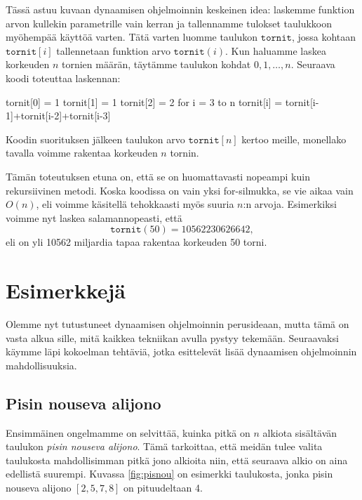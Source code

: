 Tässä astuu kuvaan dynaamisen ohjelmoinnin keskeinen idea:
laskemme funktion arvon kullekin parametrille vain kerran
ja tallennamme tulokset taulukkoon myöhempää käyttöä varten.
Tätä varten luomme taulukon $\texttt{tornit}$,
jossa kohtaan $\texttt{tornit}[i]$ tallennetaan funktion
arvo $\texttt{tornit}(i)$.
Kun haluamme laskea korkeuden $n$ tornien määrän,
täytämme taulukon kohdat $0,1,\dots,n$.
Seuraava koodi toteuttaa laskennan:

\begin{code}
tornit[0] = 1
tornit[1] = 1
tornit[2] = 2
for i = 3 to n
    tornit[i] = tornit[i-1]+tornit[i-2]+tornit[i-3]
\end{code}

Koodin suorituksen jälkeen taulukon arvo $\texttt{tornit}[n]$
kertoo meille, monellako tavalla voimme rakentaa
korkeuden $n$ tornin.

Tämän toteutuksen etuna on, että se on huomattavasti
nopeampi kuin rekursiivinen metodi.
Koska koodissa on vain yksi for-silmukka, se vie aikaa
vain $O(n)$, eli voimme käsitellä tehokkaasti myös
suuria $n$:n arvoja.
Esimerkiksi voimme nyt laskea salamannopeasti, että
\[
\texttt{tornit}(50) = 10562230626642,
\]
eli on yli 10562 miljardia tapaa rakentaa korkeuden 50 torni.

\section{Esimerkkejä}

Olemme nyt tutustuneet dynaamisen ohjelmoinnin perusideaan,
mutta tämä on vasta alkua sille, mitä kaikkea tekniikan
avulla pystyy tekemään.
Seuraavaksi käymme läpi kokoelman tehtäviä,
jotka esittelevät lisää dynaamisen ohjelmoinnin mahdollisuuksia.

\subsection{Pisin nouseva alijono}

Ensimmäinen ongelmamme on selvittää, kuinka pitkä on
$n$ alkiota sisältävän taulukon \emph{pisin nouseva alijono}.
Tämä tarkoittaa, että meidän tulee valita taulukosta
mahdollisimman pitkä jono alkioita niin,
että seuraava alkio on aina edellistä suurempi.
Kuvassa \ref{fig:pisnou} on esimerkki taulukosta,
jonka pisin nouseva alijono $[2,5,7,8]$ on pituudeltaan 4.


